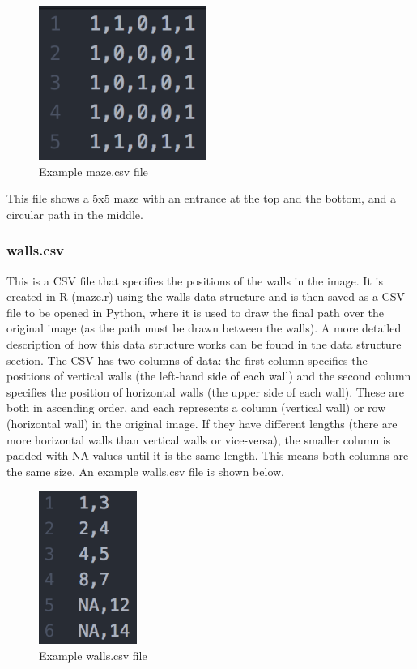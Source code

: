 \documentclass[titlepage]{article}
\begin{document}
\begin{figure}[H]
  \centering
  \includegraphics[height=5cm]{mazey.png}
  \caption{Example maze.csv file}
  \label{fig:dijk}
\end{figure}

This file shows a 5x5 maze with an entrance at the top and the bottom, and a circular path in the middle.

\subsubsection{walls.csv}
This is a CSV file that specifies the positions of the walls in the image. It is created in R (maze.r) using the walls data structure and is then saved as a CSV file to be opened in Python, where it is used to draw the final path over the original image (as the path must be drawn between the walls). A more detailed description of how this data structure works can be found in the data structure section. The CSV has two columns of data: the first column specifies the positions of vertical walls (the left-hand side of each wall) and the second column specifies the position of horizontal walls (the upper side of each wall). These are both in ascending order, and each represents a column (vertical wall) or row (horizontal wall) in the original image. If they have different lengths (there are more horizontal walls than vertical walls or vice-versa), the smaller column is padded with NA values until it is the same length. This means both columns are the same size. An example walls.csv file is shown below. 

\begin{figure}[H]
  \centering
  \includegraphics[height=5cm]{wallsss.png}
  \caption{Example walls.csv file}
  \label{fig:dijk}
\end{figure}
\end{document}
